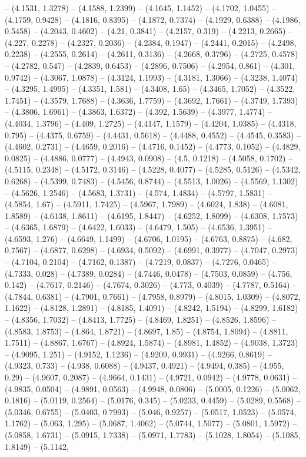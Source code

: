 -- (4.1531, 1.3278) -- (4.1588, 1.2399) -- (4.1645, 1.1452) -- (4.1702, 1.0455) -- (4.1759, 0.9428) -- (4.1816, 0.8395) -- (4.1872, 0.7374) -- (4.1929, 0.6388) -- (4.1986, 0.5458) -- (4.2043, 0.4602) -- (4.21, 0.3841) -- (4.2157, 0.319) -- (4.2213, 0.2665) -- (4.227, 0.2278) -- (4.2327, 0.2036) -- (4.2384, 0.1947) -- (4.2441, 0.2015) -- (4.2498, 0.2238) -- (4.2555, 0.2614) -- (4.2611, 0.3136) -- (4.2668, 0.3796) -- (4.2725, 0.4578) -- (4.2782, 0.547) -- (4.2839, 0.6453) -- (4.2896, 0.7506) -- (4.2954, 0.861) -- (4.301, 0.9742) -- (4.3067, 1.0878) -- (4.3124, 1.1993) -- (4.3181, 1.3066) -- (4.3238, 1.4074) -- (4.3295, 1.4995) -- (4.3351, 1.581) -- (4.3408, 1.65) -- (4.3465, 1.7052) -- (4.3522, 1.7451) -- (4.3579, 1.7688) -- (4.3636, 1.7759) -- (4.3692, 1.7661) -- (4.3749, 1.7393) -- (4.3806, 1.6961) -- (4.3863, 1.6372) -- (4.392, 1.5639) -- (4.3977, 1.4774) -- (4.4034, 1.3796) -- (4.409, 1.2725) -- (4.4147, 1.1579) -- (4.4204, 1.0385) -- (4.4318, 0.795) -- (4.4375, 0.6759) -- (4.4431, 0.5618) -- (4.4488, 0.4552) -- (4.4545, 0.3583) -- (4.4602, 0.2731) -- (4.4659, 0.2016) -- (4.4716, 0.1452) -- (4.4773, 0.1052) -- (4.4829, 0.0825) -- (4.4886, 0.0777) -- (4.4943, 0.0908) -- (4.5, 0.1218) -- (4.5058, 0.1702) -- (4.5115, 0.2348) -- (4.5172, 0.3146) -- (4.5228, 0.4077) -- (4.5285, 0.5126) -- (4.5342, 0.6268) -- (4.5399, 0.7483) -- (4.5456, 0.8744) -- (4.5513, 1.0026) -- (4.5569, 1.1302) -- (4.5626, 1.2546) -- (4.5683, 1.3731) -- (4.574, 1.4834) -- (4.5797, 1.5831) -- (4.5854, 1.67) -- (4.5911, 1.7425) -- (4.5967, 1.7989) -- (4.6024, 1.838) -- (4.6081, 1.8589) -- (4.6138, 1.8611) -- (4.6195, 1.8447) -- (4.6252, 1.8099) -- (4.6308, 1.7573) -- (4.6365, 1.6879) -- (4.6422, 1.6033) -- (4.6479, 1.505) -- (4.6536, 1.3951) -- (4.6593, 1.276) -- (4.6649, 1.1499) -- (4.6706, 1.0195) -- (4.6763, 0.8875) -- (4.682, 0.7567) -- (4.6877, 0.6298) -- (4.6934, 0.5092) -- (4.6991, 0.3977) -- (4.7047, 0.2973) -- (4.7104, 0.2104) -- (4.7162, 0.1387) -- (4.7219, 0.0837) -- (4.7276, 0.0465) -- (4.7333, 0.028) -- (4.7389, 0.0284) -- (4.7446, 0.0478) -- (4.7503, 0.0859) -- (4.756, 0.142) -- (4.7617, 0.2146) -- (4.7674, 0.3026) -- (4.773, 0.4039) -- (4.7787, 0.5164) -- (4.7844, 0.6381) -- (4.7901, 0.7661) -- (4.7958, 0.8979) -- (4.8015, 1.0309) -- (4.8072, 1.1622) -- (4.8128, 1.2891) -- (4.8185, 1.4091) -- (4.8242, 1.5194) -- (4.8299, 1.6182) -- (4.8356, 1.7032) -- (4.8413, 1.7725) -- (4.8469, 1.8251) -- (4.8526, 1.8596) -- (4.8583, 1.8753) -- (4.864, 1.8721) -- (4.8697, 1.85) -- (4.8754, 1.8094) -- (4.8811, 1.7511) -- (4.8867, 1.6767) -- (4.8924, 1.5874) -- (4.8981, 1.4852) -- (4.9038, 1.3723) -- (4.9095, 1.251) -- (4.9152, 1.1236) -- (4.9209, 0.9931) -- (4.9266, 0.8619) -- (4.9323, 0.733) -- (4.938, 0.6088) -- (4.9437, 0.4921) -- (4.9494, 0.385) -- (4.955, 0.29) -- (4.9607, 0.2087) -- (4.9664, 0.1431) -- (4.9721, 0.0942) -- (4.9778, 0.0631) -- (4.9835, 0.0504) -- (4.9891, 0.0563) -- (4.9948, 0.0806) -- (5.0005, 0.1226) -- (5.0062, 0.1816) -- (5.0119, 0.2564) -- (5.0176, 0.345) -- (5.0233, 0.4459) -- (5.0289, 0.5568) -- (5.0346, 0.6755) -- (5.0403, 0.7993) -- (5.046, 0.9257) -- (5.0517, 1.0523) -- (5.0574, 1.1762) -- (5.063, 1.295) -- (5.0687, 1.4062) -- (5.0744, 1.5077) -- (5.0801, 1.5972) -- (5.0858, 1.6731) -- (5.0915, 1.7338) -- (5.0971, 1.7783) -- (5.1028, 1.8054) -- (5.1085, 1.8149) -- (5.1142, 